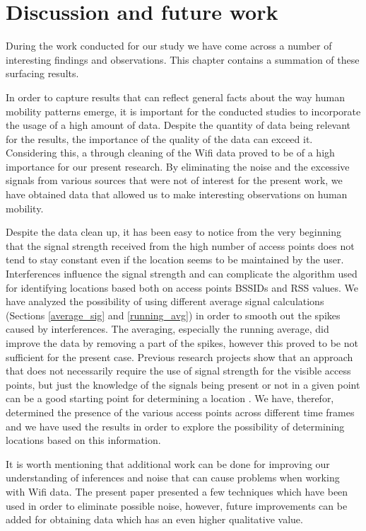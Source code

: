 \chapter{Discussion and future work}

During the work conducted for our study we have come across a number of
interesting findings and observations. This chapter contains a summation of
these surfacing results.

In order to capture results that can reflect general facts about the way human
mobility patterns emerge, it is important for the conducted studies to
incorporate the usage of a high amount of data. Despite the quantity of data
being relevant for the results, the importance of the quality of the data can
exceed it. Considering this, a through cleaning of the Wifi data proved to be of
a high importance for our present research. By eliminating the noise and the
excessive signals from various sources that were not of interest for the
present work, we have obtained data that allowed us to make interesting
observations on human mobility.

Despite the data clean up, it has been easy to notice from the very beginning
that the signal strength received from the high number of access points does not
tend to stay constant even if the location seems to be maintained by the user.
Interferences influence the signal strength \cite{MahantiCWA10} and can
complicate the algorithm used for identifying locations based both on access
points BSSIDs and RSS values. We have analyzed the possibility of using
different average signal calculations (Sections \ref{average_sig} and
\ref{running_avg}) in order to smooth out the spikes caused by interferences.
The averaging, especially the running average, did improve the data by removing
a part of the spikes, however this proved to be not sufficient for the present
case. Previous research projects show that an approach that does not necessarily
require the use of signal strength for the visible access points, but just the
knowledge of the signals being present or not in a given point can be a good
starting point for determining a location
\cite{Larsen:2009:MCT:1813042.1813063}. We have, therefor, determined the
presence of the various access points across different time frames and we have
used the results in order to explore the possibility of determining locations
based on this information.

It is worth mentioning that additional work can be done for improving our
understanding of inferences and noise that can cause problems when working with
Wifi data. The present paper presented a few techniques which have been used in
order to eliminate possible noise, however, future improvements can be added for
obtaining data which has an even higher qualitative value.

